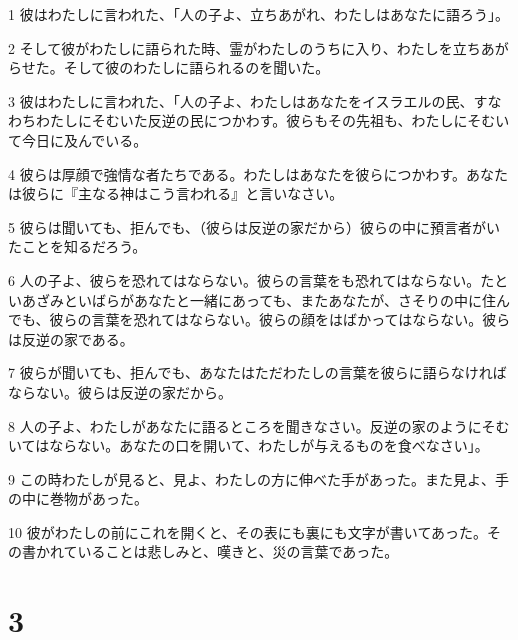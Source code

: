\par 1 彼はわたしに言われた、「人の子よ、立ちあがれ、わたしはあなたに語ろう」。
\par 2 そして彼がわたしに語られた時、霊がわたしのうちに入り、わたしを立ちあがらせた。そして彼のわたしに語られるのを聞いた。
\par 3 彼はわたしに言われた、「人の子よ、わたしはあなたをイスラエルの民、すなわちわたしにそむいた反逆の民につかわす。彼らもその先祖も、わたしにそむいて今日に及んでいる。
\par 4 彼らは厚顔で強情な者たちである。わたしはあなたを彼らにつかわす。あなたは彼らに『主なる神はこう言われる』と言いなさい。
\par 5 彼らは聞いても、拒んでも、（彼らは反逆の家だから）彼らの中に預言者がいたことを知るだろう。
\par 6 人の子よ、彼らを恐れてはならない。彼らの言葉をも恐れてはならない。たといあざみといばらがあなたと一緒にあっても、またあなたが、さそりの中に住んでも、彼らの言葉を恐れてはならない。彼らの顔をはばかってはならない。彼らは反逆の家である。
\par 7 彼らが聞いても、拒んでも、あなたはただわたしの言葉を彼らに語らなければならない。彼らは反逆の家だから。
\par 8 人の子よ、わたしがあなたに語るところを聞きなさい。反逆の家のようにそむいてはならない。あなたの口を開いて、わたしが与えるものを食べなさい」。
\par 9 この時わたしが見ると、見よ、わたしの方に伸べた手があった。また見よ、手の中に巻物があった。
\par 10 彼がわたしの前にこれを開くと、その表にも裏にも文字が書いてあった。その書かれていることは悲しみと、嘆きと、災の言葉であった。

\chapter{3}

